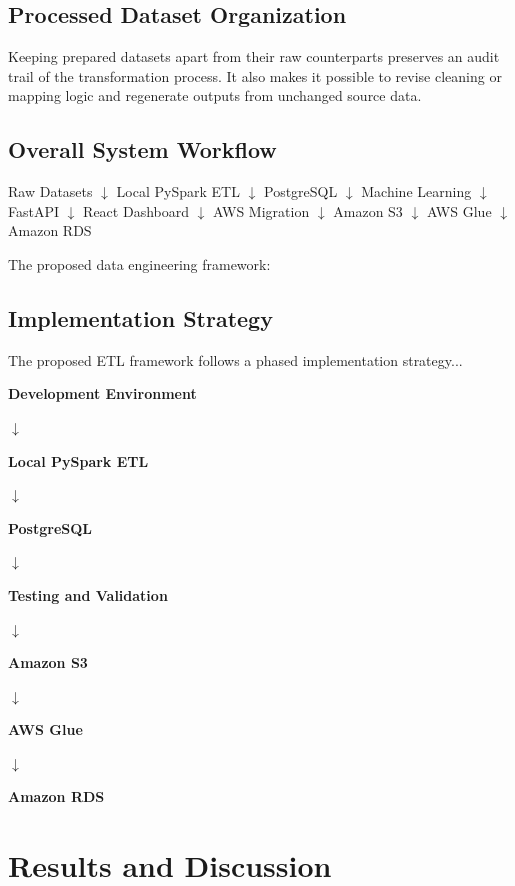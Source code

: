 \documentclass[conference]{IEEEtran}
\begin{document}
\subsection{Processed Dataset Organization}

Keeping prepared datasets apart from their raw counterparts preserves an audit trail of the transformation process. It also makes it possible to revise cleaning or mapping logic and regenerate outputs from unchanged source data.

\subsection{Overall System Workflow}

Raw Datasets
$\downarrow$
Local PySpark ETL
$\downarrow$
PostgreSQL
$\downarrow$
Machine Learning
$\downarrow$
FastAPI
$\downarrow$
React Dashboard
$\downarrow$
AWS Migration
$\downarrow$
Amazon S3
$\downarrow$
AWS Glue
$\downarrow$
Amazon RDS

The proposed data engineering framework:

\subsection{Implementation Strategy}

The proposed ETL framework follows a phased implementation strategy...

\begin{center}
\textbf{Development Environment}

$\downarrow$

\textbf{Local PySpark ETL}

$\downarrow$

\textbf{PostgreSQL}

$\downarrow$

\textbf{Testing and Validation}

$\downarrow$

\textbf{Amazon S3}

$\downarrow$

\textbf{AWS Glue}

$\downarrow$

\textbf{Amazon RDS}
\end{center}


\section{Results and Discussion}
\end{document}
